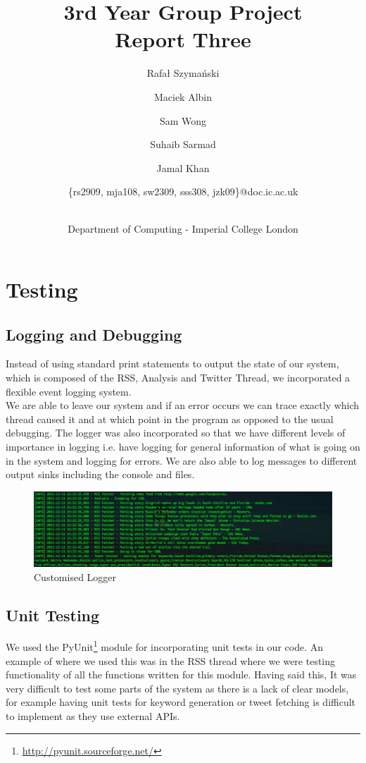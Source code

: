 \documentclass[a4paper,12pt]{article}
\title{3rd Year Group Project\\Report Three\\}
\author{
    \small{Rafał Szymański}\\
  	\and
    \small{Maciek Albin}\\
    \and
    \small{Sam Wong}\\
    \and  
    \small{Suhaib Sarmad}\\
		\and
		\small{Jamal Khan}\\
		\and
		\small{\{rs2909, mja108, sw2309, sss308, jzk09\}@doc.ic.ac.uk}
		\and
		\\Department of Computing - Imperial College London
}
\date{}
\begin{document}
 
	\maketitle
	
	\section{Testing}
	
	  \subsection{Logging and Debugging}
	
	  Instead of using standard print statements to output the state of our system, which is composed of the RSS, Analysis and Twitter Thread, we incorporated a flexible event logging system.\\
	We are able to leave our system and if an error occurs we can trace exactly which thread caused it and at which point in the program as opposed to the usual debugging.
  The logger was also incorporated so that we have different levels of importance in logging i.e. have logging for general information of what is going on in the system and logging for errors. We are also able to log messages to different output sinks including the console and files.
	
	  \begin{figure}[ht!]
				  \centering
					  \includegraphics[scale=0.4]{logger.png}
				    \caption{Customised Logger}
	  \end{figure}
	
	    \subsection{Unit Testing}

  	  We used the PyUnit\footnote{\url{http://pyunit.sourceforge.net/}} module for incorporating unit tests in our code. An example of where we used this was in the RSS thread where we were testing functionality of all the functions written for this module.
  	  Having said this, It was very difficult to test some parts of the system as there is a lack of clear models, for example having unit tests for keyword generation or tweet fetching is difficult to implement as they use external APIs.
\end{document}

